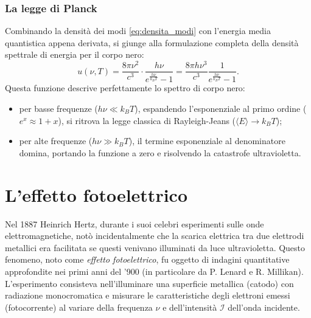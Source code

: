 \documentclass[a4paper,11pt]{report}
\begin{document}
\subsubsection{La legge di Planck}
Combinando la densità dei modi \eqref{eq:densita_modi} con l'energia media quantistica appena derivata, si giunge alla formulazione completa della densità spettrale di energia per il corpo nero:
\begin{equation}
    u(\nu, T) = \frac{8\pi \nu^2}{c^3} \cdot \frac{h \nu}{e^{\frac{h \nu}{k_B T}} - 1} = \frac{8\pi h \nu^3}{c^3} \frac{1}{e^{\frac{h \nu}{k_B T}} - 1}.
    \label{eq:legge_planck}
\end{equation}
Questa funzione descrive perfettamente lo spettro di corpo nero:
\begin{itemize}
    \item per basse frequenze ($h\nu \ll k_B T$), espandendo l'esponenziale al primo ordine ($e^x \approx 1+x$), si ritrova la legge classica di Rayleigh-Jeans ($\langle E \rangle \to k_B T$);
    \item per alte frequenze ($h\nu \gg k_B T$), il termine esponenziale al denominatore domina, portando la funzione a zero e risolvendo la catastrofe ultravioletta.
\end{itemize}

\section{L'effetto fotoelettrico}
Nel 1887 Heinrich Hertz, durante i suoi celebri esperimenti sulle onde elettromagnetiche, notò incidentalmente che la scarica elettrica tra due elettrodi metallici era facilitata se questi venivano illuminati da luce ultravioletta.
Questo fenomeno, noto come \textit{effetto fotoelettrico}, fu oggetto di indagini quantitative approfondite nei primi anni del '900 (in particolare da P. Lenard e R. Millikan).
L'esperimento consisteva nell'illuminare una superficie metallica (catodo) con radiazione monocromatica e misurare le caratteristiche degli elettroni emessi (fotocorrente) al variare della frequenza $\nu$ e dell'intensità $\mathcal{I}$ dell'onda incidente.
\end{document}
